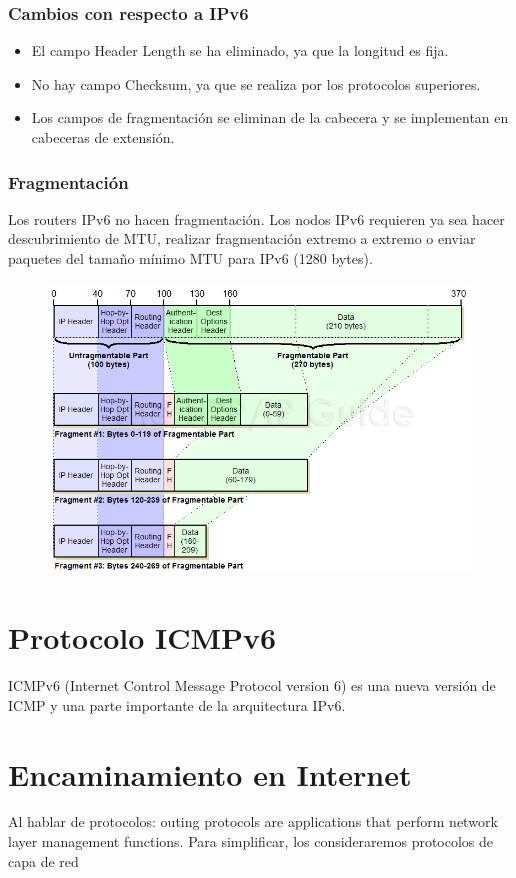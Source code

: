 \begin{onepage}
\subsubsection{Cambios con respecto a IPv6}
\begin{itemize}
    \item El campo Header Length se ha eliminado, ya que la longitud es fija.
    \item No hay campo Checksum, ya que se realiza por los protocolos superiores.
    \item Los campos de fragmentación se eliminan de la cabecera y se implementan en cabeceras de extensión.
\end{itemize}
\subsubsection{Fragmentación}
Los routers IPv6 no hacen fragmentación. Los nodos IPv6 requieren ya sea hacer descubrimiento de MTU, realizar fragmentación extremo a extremo o enviar paquetes del tamaño mínimo MTU para IPv6 (1280 bytes).\\

\begin{figure}[H]
    \centering \includegraphics[width=\textwidth]{img/ipv6_fragm.png}
\end{figure}
\end{onepage}
\section{Protocolo ICMPv6}
ICMPv6 (Internet Control Message Protocol version 6) es una nueva versión de ICMP y una parte importante de la arquitectura IPv6.
\section{Encaminamiento en Internet}
Al hablar de protocolos: outing protocols are applications that perform network layer management functions. Para simplificar, los consideraremos protocolos de capa de red